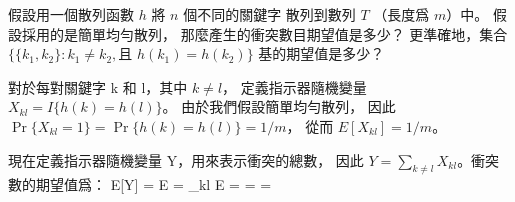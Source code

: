 \startEXERCISE
假設用一個散列函數 $h$ 將 $n$ 個不同的關鍵字
散列到數列 $T$ （長度爲 $m$）中。
假設採用的是簡單均勻散列，
那麼產生的衝突數目期望值是多少？
更準確地，集合 $\{\{k_1,k_2\}: k_1\ne k_2, \text{且 }h(k_1)=h(k_2)\}$ 基的期望值是多少？
\stopEXERCISE

\startANSWER
對於每對關鍵字 k 和 l，其中 $k\ne l$，
定義指示器隨機變量 $X_{kl}=I\{h(k)=h(l)\}$。
由於我們假設簡單均勻散列，
因此 $\Pr\{X_{kl}=1\} = \Pr\{h(k)=h(l)\} = 1/m$，
從而 $E[X_{kl}] = 1/m$。

現在定義指示器隨機變量 Y，用來表示衝突的總數，
因此 $Y=\sum_{k\ne l}X_{kl}$。衝突數的期望值爲：
\startsplitformula\startmathalignment
\NC E[Y]
    \NC = E \NR
\NC \NC = \sum_{k\ne l} E\left[ X_{kl} \right] \NR
\NC \NC =  \NR
\NC \NC = \times {} \NR
\NC \NC =  \NR
\stopmathalignment\stopsplitformula
\stopANSWER
